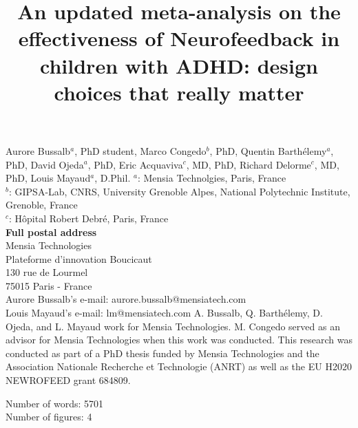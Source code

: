 

\title{An updated meta-analysis on the effectiveness of Neurofeedback in children with ADHD: design choices that really matter} %
\maketitle
\noindent Aurore Bussalb$^a$, PhD student, Marco Congedo$^b$, PhD, Quentin Barth\'elemy$^a$, PhD, David Ojeda$^a$, PhD, 
Eric Acquaviva$^c$, MD, PhD, Richard Delorme$^c$, MD, PhD, Louis Mayaud$^a$, D.Phil. 
\smallbreak
\noindent $^a$: Mensia Technolgies, Paris, France \\
\noindent $^b$: GIPSA-Lab, CNRS, University Grenoble Alpes, National Polytechnic Institute, Grenoble, France \\
\noindent $^c$: Hôpital Robert Debré, Paris, France \\ 
\smallbreak
\noindent\textbf{Full postal address} \\
Mensia Technologies \\
Plateforme d'innovation Boucicaut \\
130 rue de Lourmel \\
75015 Paris - France \\
Aurore Bussalb's e-mail: aurore.bussalb@mensiatech.com \\
Louis Mayaud's e-mail: lm@mensiatech.com 
\smallbreak
A. Bussalb, Q. Barth\'elemy, D. Ojeda, and L. Mayaud work for Mensia Technologies.
M. Congedo served as an advisor for Mensia Technologies when this work was conducted. 
\smallbreak
This research was conducted as part of a PhD thesis funded by Mensia Technologies and the Association Nationale 
Recherche et Technologie (ANRT) as well as the EU H2020 NEWROFEED grant 684809.

\noindent Number of words: 5701 \\
\noindent Number of figures: 4 
